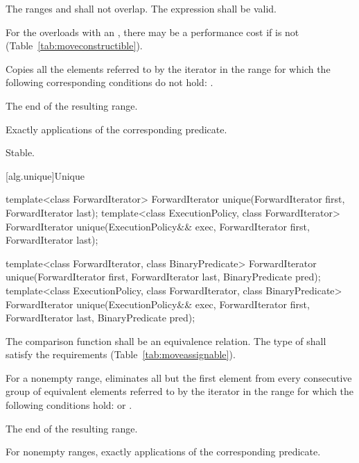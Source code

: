\begin{itemdescr}
\pnum
\requires
The ranges
and
shall not overlap. The expression  shall be valid.
\begin{note}
For the overloads with an , there may be a performance
cost if  is not
 (Table~\ref{tab:moveconstructible}).
\end{note}

\pnum
\effects
Copies all the elements referred to by the iterator
in the range
for which the following corresponding conditions do not hold:
.

\pnum
\returns
The end of the resulting range.

\pnum
\complexity
Exactly
applications of the corresponding predicate.

\pnum
\remarks Stable.
\end{itemdescr}

[alg.unique]{Unique}

%
\begin{itemdecl}
template<class ForwardIterator>
  ForwardIterator unique(ForwardIterator first, ForwardIterator last);
template<class ExecutionPolicy, class ForwardIterator>
  ForwardIterator unique(ExecutionPolicy&& exec,
                         ForwardIterator first, ForwardIterator last);

template<class ForwardIterator, class BinaryPredicate>
  ForwardIterator unique(ForwardIterator first, ForwardIterator last,
                         BinaryPredicate pred);
template<class ExecutionPolicy, class ForwardIterator, class BinaryPredicate>
  ForwardIterator unique(ExecutionPolicy&& exec,
                         ForwardIterator first, ForwardIterator last,
                         BinaryPredicate pred);
\end{itemdecl}

\begin{itemdescr}
\pnum
\requires
The comparison function shall be an equivalence relation.
The type of  shall satisfy the
 requirements (Table~\ref{tab:moveassignable}).

\pnum
\effects
For a nonempty range, eliminates all but the first element from every
consecutive group of equivalent elements referred to by the iterator
in the range
for which the following conditions hold:
or
.

\pnum
\returns
The end of the resulting range.

\pnum
\complexity
For nonempty ranges, exactly
applications of the corresponding predicate.
\end{itemdescr}

